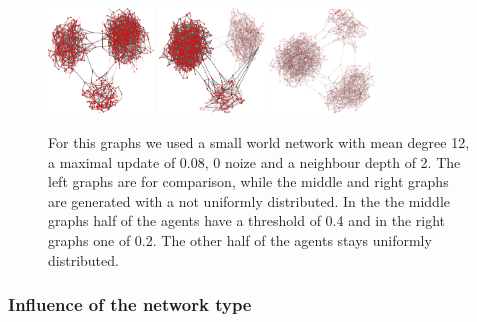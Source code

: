 \begin{figure}
\includegraphics[width=0.25\textwidth]{batchRun__kHalf=2-2-2_maxUpdate=0.08_noize=0_nbrDepth=2/network1000-crop.pdf}
\hfill
\includegraphics[width=0.25\textwidth]{batchRun__kHalf=2-2-2_maxUpdate=0.08_noize=0_nbrDepth=2_fixedthreshold=0.4/network1000-crop.pdf}
\hfill
\includegraphics[width=0.25\textwidth]{batchRun__kHalf=2-2-2_maxUpdate=0.08_noize=0_nbrDepth=2_fixedthreshold=0.2/network1000-crop.pdf}

\caption{For this graphs we used a small world network with mean degree 12, a maximal update of 0.08, 0 noize and a neighbour depth of 2. The left graphs are for comparison, while the middle and right graphs are generated with a not uniformly distributed. In the the middle graphs half of the agents have a threshold of 0.4 and in the right graphs one of 0.2. The other half of the agents stays uniformly distributed.}
\label{influencenthresholdnetwork}
\end{figure}

\subsubsection{Influence of the network type}
\label{sec:influencenetworktype}


